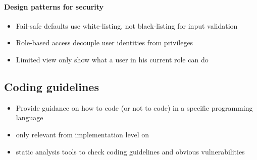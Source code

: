\documentclass[12pt,titlepage,a4paper]{report}
\begin{document}
	\paragraph{Design patterns for security}
	\begin{itemize}
		\item Fail-safe defaults
			\subitem use white-listing, not black-listing for input validation
		\item Role-based access
			\subitem decouple user identities from privileges
		\item Limited view
			\subitem only show what a user in his current role can do
	\end{itemize}

	\subsection{Coding guidelines}
	\begin{itemize}
		\item[\textrightarrow] Provide guidance on how to code (or not to code) in a specific programming language
		\item only relevant from implementation level on
		\item static analysis tools to check coding guidelines and obvious vulnerabilities
	\end{itemize}
\end{document}
